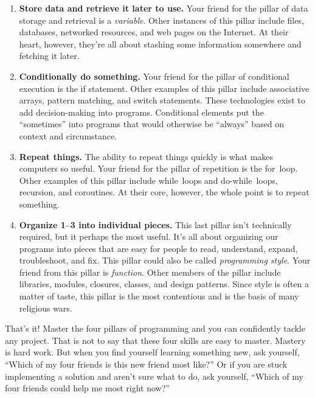 \begin{enumerate}
  \item \textbf{Store data and retrieve it later to use.}
  Your friend for the pillar of data storage and retrieval is a \emph{variable}. Other instances of this pillar include files, databases, networked resources, and web pages on the Internet. At their heart, however, they're all about stashing some information somewhere and fetching it later.

  \item \textbf{Conditionally do something.}
  Your friend for the pillar of conditional execution is the \textsf{if} statement. Other examples of this pillar include associative arrays, pattern matching, and \textsf{switch} statements. These technologies exist to add decision-making into programs. Conditional elements put the ``sometimes'' into programs that would otherwise be ``always'' based on context and circumstance.

  \item \textbf{Repeat things.}
  The ability to repeat things quickly is what makes computers so useful. Your friend for the pillar of repetition is the \textsf{for}~loop. Other examples of this pillar include \textsf{while}~loops and \textsf{do-while}~loops, recursion, and coroutines. At their core, however, the whole point is to repeat something.

  \item \textbf{Organize 1--3 into individual pieces.}
  This last pillar isn't technically required, but it perhaps the most useful. It's all about organizing our programs into pieces that are easy for people to read, understand, expand, troubleshoot, and fix. This pillar could also be called \emph{programming style}. Your friend from this pillar is \emph{function}. Other members of the pillar include libraries, modules, closures, classes, and design patterns. Since style is often a matter of taste, this pillar is the most contentious and is the basis of many religious wars.
\end{enumerate}

That's it! Master the four pillars of programming and you can confidently tackle any project. That is not to say that these four skills are easy to master. Mastery is hard work. But when you find yourself learning something new, ask yourself, ``Which of my four friends is this new friend most like?'' Or if you are stuck implementing a solution and aren't sure what to do, ask yourself, ``Which of my four friends could help me most right now?''

